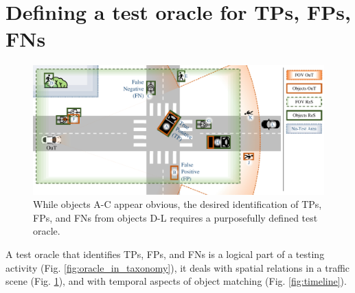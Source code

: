 \documentclass[conference]{IEEEtran}
\begin{document}






  






\section{Defining a test oracle for TPs, FPs, FNs}
\label{sec:criteria}



\begin{figure}[t]
	\centering
	\vspace*{2mm}
	\includegraphics[width=\textwidth]{img/top_down_fitting_slide.pdf}
	
	\caption{ While objects A-C appear obvious, the desired identification of TPs, FPs, and FNs from objects D-L requires a purposefully defined test oracle. 
	}
	\label{fig:top_down_all}
\end{figure}


A test oracle that identifies TPs, FPs, and FNs is a logical part of a testing activity (Fig. \ref{fig:oracle_in_taxonomy}), it deals with spatial relations in a traffic scene (Fig. \ref{fig:top_down_all}), and with temporal aspects of object matching (Fig. \ref{fig:timeline}).
\end{document}
